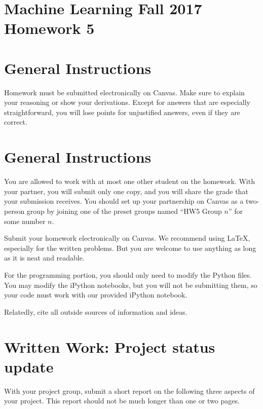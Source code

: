 \documentclass[10pt]{article}
\begin{document}
\section*{Machine Learning Fall 2017 Homework 5}

\section*{General Instructions}

Homework must be submitted electronically on Canvas. Make sure to explain your reasoning or show your derivations. Except for answers that are especially straightforward, you will lose points for unjustified answers, even if they are correct.

\section*{General Instructions}

You are allowed to work with at most one other student on the homework. With your partner, you will submit only one copy, and you will share the grade that your submission receives. You should set up your partnership on Canvas as a two-person group by joining one of the preset groups named ``HW5 Group $n$'' for some number $n$.

Submit your homework electronically on Canvas. We recommend using LaTeX, especially for the written problems. But you are welcome to use anything as long as it is neat and readable.

For the programming portion, you should only need to modify the Python files. You may modify the iPython notebooks, but you will not be submitting them, so your code must work with our provided iPython notebook.

Relatedly, cite all outside sources of information and ideas.

\section*{Written Work: Project status update}

With your project group, submit a short report on the following three aspects of your project. This report should not be much longer than one or two pages.
\end{document}
